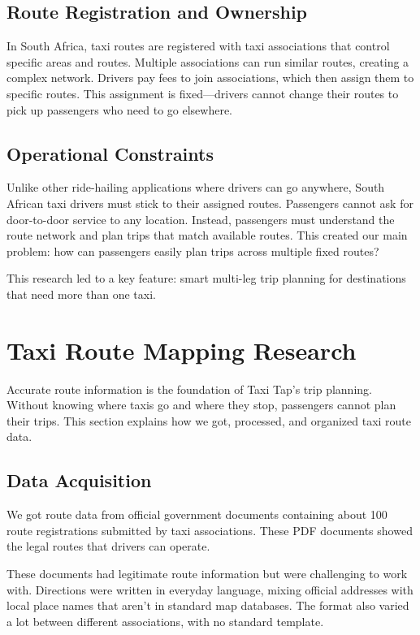 \documentclass[a4paper,12pt]{article}
\begin{document}
\subsection{Route Registration and Ownership}
In South Africa, taxi routes are registered with taxi associations that control specific areas and routes. Multiple associations can run similar routes, creating a complex network. Drivers pay fees to join associations, which then assign them to specific routes. This assignment is fixed—drivers cannot change their routes to pick up passengers who need to go elsewhere.

\subsection{Operational Constraints}
Unlike other ride-hailing applications where drivers can go anywhere, South African taxi drivers must stick to their assigned routes. Passengers cannot ask for door-to-door service to any location. Instead, passengers must understand the route network and plan trips that match available routes. This created our main problem: how can passengers easily plan trips across multiple fixed routes?

This research led to a key feature: smart multi-leg trip planning for destinations that need more than one taxi.

\section{Taxi Route Mapping Research}
Accurate route information is the foundation of Taxi Tap's trip planning. Without knowing where taxis go and where they stop, passengers cannot plan their trips. This section explains how we got, processed, and organized taxi route data.

\subsection{Data Acquisition}
We got route data from official government documents containing about 100 route registrations submitted by taxi associations. These PDF documents showed the legal routes that drivers can operate.

These documents had legitimate route information but were challenging to work with. Directions were written in everyday language, mixing official addresses with local place names that aren't in standard map databases. The format also varied a lot between different associations, with no standard template.
\end{document}
